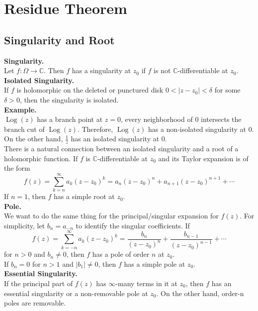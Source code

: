 \documentclass[11pt]{article}
\begin{document}
\section{Residue Theorem}
\subsection{Singularity and Root}
\textbf{Singularity.} \\
Let $f: \Omega \to \mathbb{C}$. Then $f$ has a singularity at $z_0$ if $f$ is not $\mathbb{C}$-differentiable at $z_0$. \\
\newline
\textbf{Isolated Singularity.} \\
If $f$ is holomorphic on the deleted or punctured disk $0 < |z - z_0| < \delta$ for some $\delta > 0$,  then the singularity is isolated. \\
\newline
\textbf{Example.} \\
$\operatorname{Log}(z)$ has a branch point at $z = 0$, every neighborhood of 0 intersects the branch cut of $\operatorname{Log}(z)$. Therefore, $\operatorname{Log}(z)$ has a non-isolated singularity at 0. \\
On the other hand, $\frac{1}{z}$ has an isolated singularity at 0. \\
\newline
There is a natural connection between an isolated singularity and a root of a holomorphic function. If $f$ is $\mathbb{C}$-differentiable at $z_0$ and its Taylor expansion is of the form 
$$f(z) = \sum_{k = n}^{\infty} a_k(z - z_0)^k = a_n(z-z_0)^n + a_{n + 1}(z - z_0)^{n + 1}+ \cdots$$
If $n = 1$, then $f$ has a simple root at $z_0$. \\
\newline
\textbf{Pole.} \\
We want to do the same thing for the principal/singular expansion for $f(z)$. For simplicity, let $b_n = a_{-n}$ to identify the singular coefficients. If 
$$f(z) = \sum_{k = -n}^{\infty} a_k(z - z_0)^k = \frac{b_n}{(z - z_0)^n} + \frac{b_{n - 1}}{(z - z_0)^{n - 1}} + \cdots$$
for $n > 0$ and $b_n \neq 0$, then $f$ has a pole of order $n$ at $z_0$. \\
If $b_n = 0$ for $n > 1$ and $|b_1| \neq 0$, then $f$ has a simple pole at $z_0$. \\
\newline
\textbf{Essential Singularity.} \\
If the principal part of $f(z)$ has $\infty$-many terms in it at $z_0$, then $f$ has an essential singularity or a non-removable pole at $z_0$. On the other hand, order-n poles are removable. \\
\end{document}
